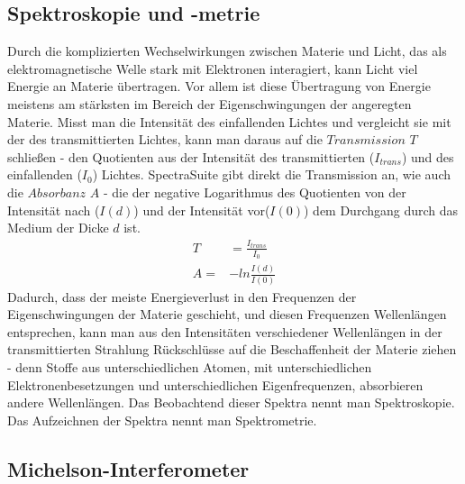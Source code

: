 \documentclass{article}
\begin{document}
\subsection{Spektroskopie und -metrie}
Durch die komplizierten Wechselwirkungen zwischen Materie und Licht, das als elektromagnetische Welle stark mit Elektronen interagiert, kann Licht viel Energie an Materie übertragen. Vor allem ist diese Übertragung von Energie meistens am stärksten im Bereich der Eigenschwingungen der angeregten Materie. Misst man die Intensität des einfallenden Lichtes und vergleicht sie mit der des transmittierten Lichtes, kann man daraus auf die $Transmission$ $T$ schließen - den Quotienten aus der Intensität des transmittierten ($I_{trans}$) und des einfallenden ($I_{0}$) Lichtes. SpectraSuite gibt direkt die Transmission an, wie auch die $Absorbanz$ $A$ - die der negative Logarithmus des Quotienten von der Intensität nach ($I(d)$) und der Intensität vor($I(0)$) dem Durchgang durch das Medium der Dicke $d$ ist.\\
\begin{align*}
T&=\frac{I_{trans}}{I_{0}}\\
A=&-ln\frac{I(d)}{I(0)}
\end{align*} Dadurch, dass der meiste Energieverlust in den Frequenzen der Eigenschwingungen der Materie geschieht, und diesen Frequenzen Wellenlängen entsprechen, kann man aus den Intensitäten verschiedener Wellenlängen in der transmittierten Strahlung Rückschlüsse auf die Beschaffenheit der Materie ziehen - denn Stoffe aus unterschiedlichen Atomen, mit unterschiedlichen Elektronenbesetzungen und unterschiedlichen Eigenfrequenzen, absorbieren andere Wellenlängen. Das Beobachtend dieser Spektra nennt man Spektroskopie. Das Aufzeichnen der Spektra nennt man Spektrometrie.
\
\subsection{Michelson-Interferometer}
\end{document}
